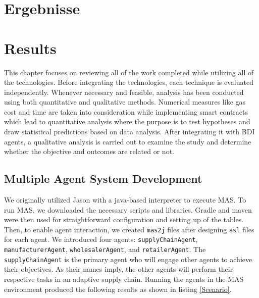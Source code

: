 {\chapter{Ergebnisse}}
{\chapter{Results}}

\label{sec:results}

This chapter focuses on reviewing all of the work completed while utilizing all of the technologies. Before integrating the technologies, each technique is evaluated independently. Whenever necessary and feasible, analysis has been conducted using both quantitative and qualitative methods. Numerical measures like gas cost and time are taken into consideration while implementing smart contracts which lead to quantitative analysis where the purpose is to test hypotheses and draw statistical predictions based on data analysis. After integrating it with \ac{BDI} agents, a qualitative analysis is carried out to examine the study and determine whether the objective and outcomes are related or not.

\section{Multiple Agent System Development}

We originally utilized Jason with a java-based interpreter to execute \ac{MAS}. To run \ac{MAS}, we downloaded the necessary scripts and libraries. Gradle and maven were then used for straightforward configuration and setting up of the tables. Then, to enable agent interaction, we created \texttt{mas2j} files after designing \texttt{asl} files for each agent. We introduced four agents: \texttt{supplyChainAgent}, \texttt{manufacturerAgent}, \texttt{wholesalerAgent}, and \texttt{retailerAgent}. The \texttt{supplyChainAgent} is the primary agent who will engage other agents to achieve their objectives. As their names imply, the other agents will perform their respective tasks in an adaptive supply chain. Running the agents in the \ac{MAS} environment produced the following results as shown in listing \ref{Scenario}.

\vspace{.5cm}

